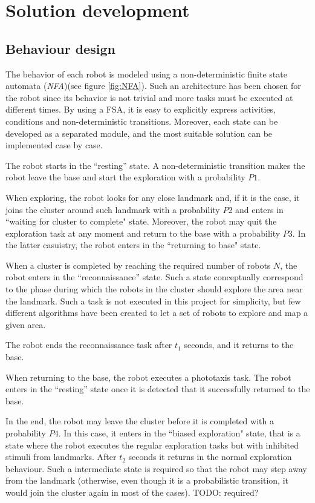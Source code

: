 \chapter{Solution development}

\section{Behaviour design}

The behavior of each robot is modeled using a non-deterministic finite state automata (\textit{NFA})(see figure \ref{fig:NFA}). Such an architecture has been chosen for the robot since its behavior is not trivial and more tasks must be executed at different times. By using a FSA, it is easy to explicitly express activities, conditions and non-deterministic transitions. Moreover, each state can be developed as a separated module, and the most suitable solution can be implemented case by case.

\noindent
The robot starts in the ``resting'' state. A non-deterministic transition makes the robot leave the base and start the exploration with a probability $P1$. 

\noindent
When exploring, the robot looks for any close landmark and, if it is the case, it joins the cluster around such landmark with a probability $P2$ and enters in ``waiting for cluster to complete" state. Moreover, the robot may quit the exploration task at any moment and return to the base with a probability $P3$. In the latter casuistry, the robot enters in the ``returning to base" state.

\noindent
When a cluster is completed by reaching the required number of robots $N$, the robot enters in the ``reconnaissance'' state. Such a state conceptually correspond to the phase during which the robots in the cluster should explore the area near the landmark. Such a task is not executed in this project for simplicity, but few different algorithms have been created to let a set of robots to explore and map a given area.

\noindent
The robot ends the reconnaissance task after $t_1$ seconds, and it returns to the base.

\noindent
When returning to the base, the robot executes a phototaxis task. The robot enters in the ``resting'' state once it is detected that it successfully returned to the base. 

\noindent
In the end, the robot may leave the cluster before it is completed with a probability $P4$. In this case, it enters in the ``biased exploration" state, that is a state where the robot executes the regular exploration tasks
but with inhibited stimuli from landmarks. After $t_2$ seconds it returns in the normal exploration behaviour. Such a intermediate state is required so that the robot may step away from the landmark (otherwise, even though it is a probabilistic transition, it would join the cluster again in most of the cases). TODO: required?  

